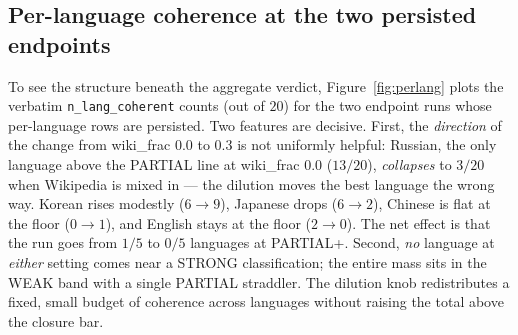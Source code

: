\documentclass[11pt,a4paper]{article}
\begin{document}
\subsection{Per-language coherence at the two persisted endpoints}

To see the structure beneath the aggregate verdict, Figure~\ref{fig:perlang}
plots the verbatim \verb|n_lang_coherent| counts (out of $20$) for the two
endpoint runs whose per-language rows are persisted. Two features are
decisive. First, the \emph{direction} of the change from wiki\_frac $0.0$
to $0.3$ is not uniformly helpful: Russian, the only language above the
PARTIAL line at wiki\_frac $0.0$ ($13/20$), \emph{collapses} to $3/20$
when Wikipedia is mixed in --- the dilution moves the best language the
wrong way. Korean rises modestly ($6\to9$), Japanese drops ($6\to2$),
Chinese is flat at the floor ($0\to1$), and English stays at the floor
($2\to0$). The net effect is that the run goes from $1/5$ to $0/5$
languages at PARTIAL+. Second, \emph{no} language at \emph{either} setting
comes near a STRONG classification; the entire mass sits in the WEAK band
with a single PARTIAL straddler. The dilution knob redistributes a fixed,
small budget of coherence across languages without raising the total
above the closure bar.
\end{document}
